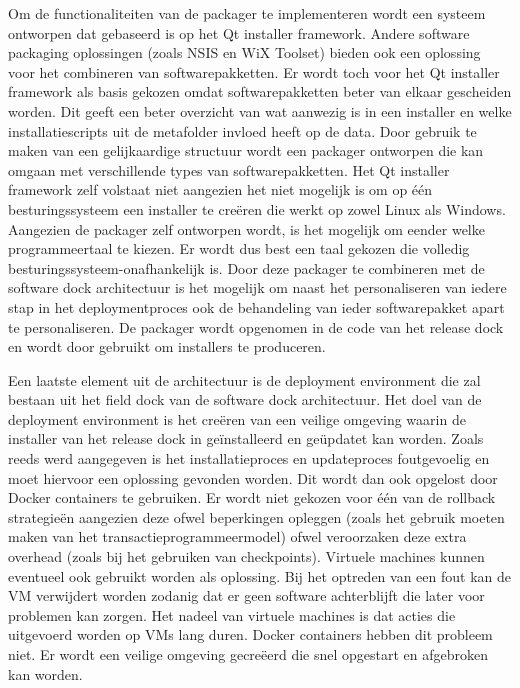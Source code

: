 Om de functionaliteiten van de packager te implementeren wordt een systeem ontworpen dat gebaseerd is op het Qt installer framework.
Andere software packaging oplossingen (zoals NSIS en WiX Toolset) bieden ook een oplossing voor het combineren van softwarepakketten.
Er wordt toch voor het Qt installer framework als basis gekozen omdat softwarepakketten beter van elkaar gescheiden worden.
Dit geeft een beter overzicht van wat aanwezig is in een installer en welke installatiescripts uit de metafolder invloed heeft op de data.
Door gebruik te maken van een gelijkaardige structuur wordt een packager ontworpen die kan omgaan met verschillende types van softwarepakketten.
Het Qt installer framework zelf volstaat niet aangezien het niet mogelijk is om op één besturingssysteem een installer te creëren die werkt op zowel Linux als Windows.
Aangezien de packager zelf ontworpen wordt, is het mogelijk om eender welke programmeertaal te kiezen.
Er wordt dus best een taal gekozen die volledig besturingssysteem-onafhankelijk is.
Door deze packager te combineren met de software dock architectuur is het mogelijk om naast het personaliseren van iedere stap in het deploymentproces ook de behandeling van ieder softwarepakket apart te personaliseren.
De packager wordt opgenomen in de code van het release dock en wordt door gebruikt om installers te produceren.

Een laatste element uit de architectuur is de deployment environment die zal bestaan uit het field dock van de software dock architectuur.
Het doel van de deployment environment is het creëren van een veilige omgeving waarin de installer van het release dock in geïnstalleerd en geüpdatet kan worden.
Zoals reeds werd aangegeven is het installatieproces en updateproces foutgevoelig en moet hiervoor een oplossing gevonden worden.
Dit wordt dan ook opgelost door Docker containers te gebruiken.
Er wordt niet gekozen voor één van de rollback strategieën aangezien deze ofwel beperkingen opleggen (zoals het gebruik moeten maken van het transactieprogrammeermodel) ofwel veroorzaken deze extra overhead (zoals bij het gebruiken van checkpoints).
Virtuele machines kunnen eventueel ook gebruikt worden als oplossing.
Bij het optreden van een fout kan de VM verwijdert worden zodanig dat er geen software achterblijft die later voor problemen kan zorgen.
Het nadeel van virtuele machines is dat acties die uitgevoerd worden op VMs lang duren.
Docker containers hebben dit probleem niet.
Er wordt een veilige omgeving gecreëerd die snel opgestart en afgebroken kan worden.

